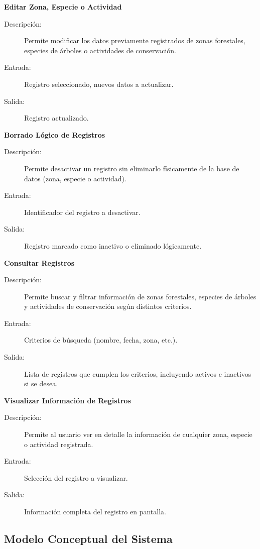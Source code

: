 \textbf{Editar Zona, Especie o Actividad}
\begin{description}
    \item[Descripción:] Permite modificar los datos previamente registrados de zonas forestales, especies de árboles o actividades de conservación.
    \item[Entrada:] Registro seleccionado, nuevos datos a actualizar.
    \item[Salida:] Registro actualizado.
\end{description}

\textbf{Borrado Lógico de Registros}
\begin{description}
    \item[Descripción:] Permite desactivar un registro sin eliminarlo físicamente de la base de datos (zona, especie o actividad).
    \item[Entrada:] Identificador del registro a desactivar.
    \item[Salida:] Registro marcado como inactivo o eliminado lógicamente.
\end{description}

\textbf{Consultar Registros}
\begin{description}
    \item[Descripción:] Permite buscar y filtrar información de zonas forestales, especies de árboles y actividades de conservación según distintos criterios.
    \item[Entrada:] Criterios de búsqueda (nombre, fecha, zona, etc.).
    \item[Salida:] Lista de registros que cumplen los criterios, incluyendo activos e inactivos si se desea.
\end{description}

\textbf{Visualizar Información de Registros}
\begin{description}
    \item[Descripción:] Permite al usuario ver en detalle la información de cualquier zona, especie o actividad registrada.
    \item[Entrada:] Selección del registro a visualizar.
    \item[Salida:] Información completa del registro en pantalla.
\end{description}

\subsection{Modelo Conceptual del Sistema}

